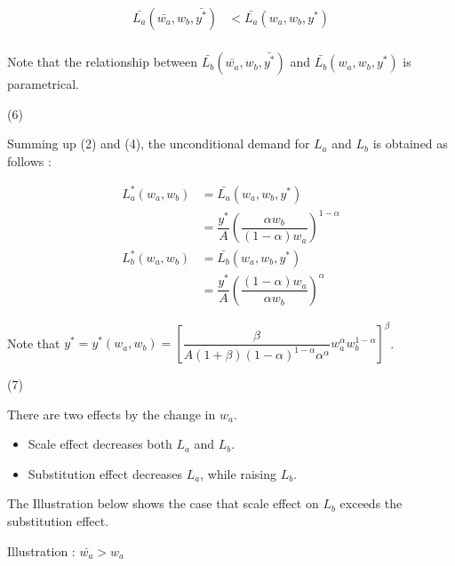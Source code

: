\documentclass[dvipdfmx]{jsarticle}
\begin{document}
\begin{enumerate}
  \begin{align*}
  \bar{L_a}(\bar{w_a}, w_b, \bar{y^*}) &< \bar{L_a}(w_a, w_b, y^*) \\
  \end{align*}
 
 Note that the relationship between $\bar{L_b}(\bar{w_a}, w_b, \bar{y^*})$ and $\bar{L_b}(w_a, w_b, y^*)$ is parametrical.
 
 (6)
 
 Summing up (2) and (4), the unconditional demand for $L_a$ and $L_b$ is obtained as follows :
 
  \begin{align*}
  L^*_a(w_a, w_b) &= \bar{L_a}(w_a, w_b, y^*) \\
  &= \dfrac{y^*}{A} \left( \dfrac{\alpha w_b}{(1-\alpha) w_a} \right)^{1-\alpha} \\
  L^*_b(w_a, w_b) &= \bar{L_b}(w_a, w_b, y^*) \\
  &= \dfrac{y^*}{A} \left( \dfrac{(1-\alpha) w_a}{\alpha w_b} \right)^{\alpha}
  \end{align*}
 
 Note that $y^* = y^* (w_a, w_b) = \left[ \dfrac{\beta}{A(1+\beta)(1-\alpha)^{1-\alpha} \alpha^\alpha}
  w_a^{\alpha} w_b^{1-\alpha} \right]^{\beta}$.
  
 (7)
 
 There are two effects by the change in $w_a$.
 
 \begin{itemize}
 
  \item Scale effect decreases both $L_a$ and $L_b$.
 
  \item Substitution effect decreases $L_a$, while raising $L_b$.
 
 \end{itemize}
 
 The Illustration below shows the case that scale effect  on $L_b$ exceeds the substitution effect.
 
 \begin{center}
 
 \newpage
 
 Illustration : $\bar{w_a} > w_a$
 
 

\end{center}
\end{enumerate}
\end{document}

